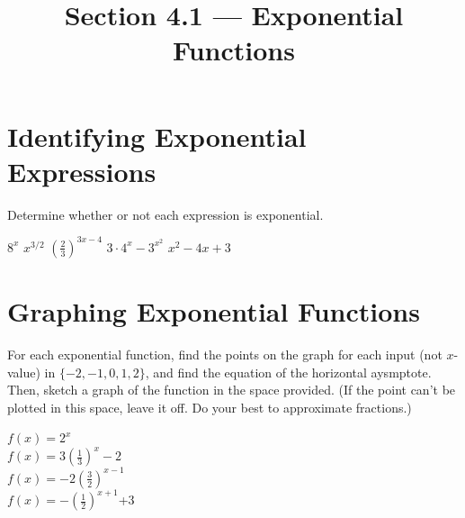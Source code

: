 

\title{Section 4.1 --- Exponential Functions}


\maketitle

\section*{Identifying Exponential Expressions}
Determine whether or not each expression is exponential.
\begin{smenum}
\mitemxxxxx
{$8^x$}
{$x^{3/2}$}
{$\left(\frac{2}{3}\right)^{3x-4}$}
{$3\cdot 4^x-3^{x^2}$}
{$x^2-4x+3$}
\end{smenum}

\section*{Graphing Exponential Functions}
For each exponential function, find the points on the graph for each input (not $x$-value) in $\{-2,-1,0,1,2\}$, and find the equation of the horizontal aysmptote. Then, sketch a graph of the function in the space provided. (If the point can't be plotted in this space, leave it off. Do your best to approximate fractions.)
\begin{smenum}
\mitemxx
{$f(x)=2^x$\\
\GridSquareFitEO[10]
}
{$f(x)=3\left(\frac{1}{3}\right)^x-2$\\
\GridSquareFitEO[10]
}
\mitemxx
{$f(x)=-2\left(\frac{3}{2}\right)^{x-1}$\\
\GridSquareFitEO[10]
}
{$f(x)=-\left(\frac{1}{2}\right)^{x+1}$+3\\
\GridSquareFitEO[10]
}\end{smenum}

\clearpage

